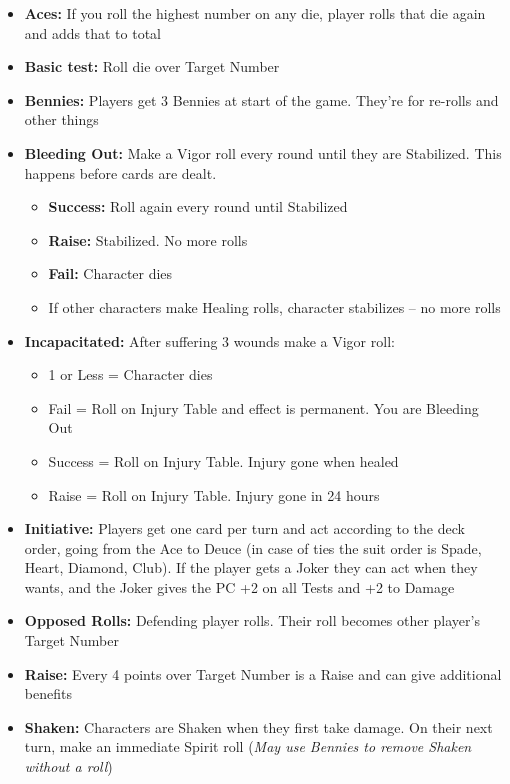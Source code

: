 \documentclass[10pt,twoside]{article}
\begin{document}
\begin{multicols}{2}
  \begin{itemize}
    \item \textbf{Aces:} If you roll the highest number on any die, player rolls that die again and adds that to total
    \item \textbf{Basic test:} Roll die over Target Number
    \item \textbf{Bennies:} Players get 3 Bennies at start of the game. They’re for re-rolls and other things
    \item \textbf{Bleeding Out:} Make a Vigor roll every round until they are Stabilized. This happens before cards are dealt.
      \begin{itemize}
        \item \textbf{Success:} Roll again every round until Stabilized
        \item \textbf{Raise:} Stabilized. No more rolls
        \item \textbf{Fail:} Character dies
        \item If other characters make Healing rolls, character stabilizes – no more rolls
      \end{itemize}
    \item \textbf{Incapacitated:} After suffering 3 wounds make a Vigor roll:
      \begin{itemize}
        \item 1 or Less = Character dies
        \item Fail = Roll on Injury Table and effect is permanent. You are Bleeding Out
        \item Success = Roll on Injury Table. Injury gone when healed
        \item Raise = Roll on Injury Table. Injury gone in 24 hours
      \end{itemize}
    \item \textbf{Initiative:} Players get one card per turn and act according to the deck order, going from the Ace to Deuce (in case of ties the suit order is Spade, Heart, Diamond, Club). If the player gets a Joker they can act when they wants, and the Joker gives the PC +2 on all Tests and +2 to Damage
    \item \textbf{Opposed Rolls:} Defending player rolls. Their roll becomes other player’s Target Number
    \item \textbf{Raise:} Every 4 points over Target Number is a Raise and can give additional benefits
    \item \textbf{Shaken:} Characters are Shaken when they first take damage. On their next turn, make an immediate Spirit roll (\textit{May use Bennies to remove Shaken without a roll}) 

\end{itemize}
\end{multicols}
\end{document}
